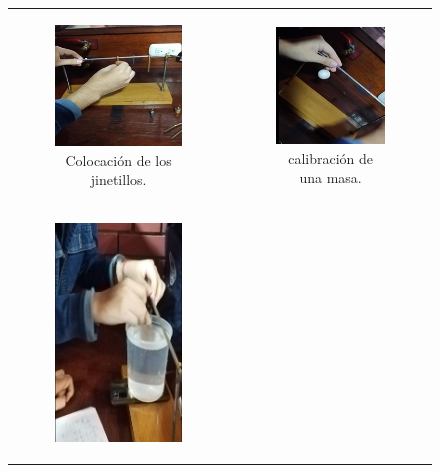 \documentclass[../main.tex]{subfiles}
\begin{document}
\begin{figure}[H]
    \centering
    \begin{tabular}{c c}
        \centering
        \begin{subfigure}{0.4\linewidth}
            \centering
            \includegraphics[width=0.4\linewidth]{resources/proc1.jpg}
            \caption{Colocación de los jinetillos.}
            \label{fig:proc1}
        \end{subfigure} &
        \begin{subfigure}{0.4\linewidth}
            \centering
            \includegraphics[width=0.4\linewidth]{resources/proc2.jpg}
            \caption{calibración de una masa.}
            \label{fig:proc2}
        \end{subfigure}\\
        \begin{subfigure}{0.4\linewidth}
            \centering
            \includegraphics[width=0.4\linewidth,height=0.4\linewidth]{resources/proc3.jpg}

\end{subfigure}
\end{tabular}
\end{figure}
\end{document}
